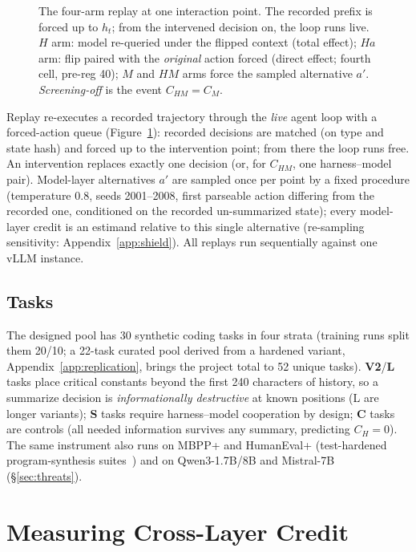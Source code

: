 \documentclass{article}
\theoremstyle{remark}
\begin{document}
\begin{figure}[t]
{}
\caption{The four-arm replay at one interaction point. The recorded
prefix is forced up to $h_t$; from the intervened decision on, the loop
runs live. $H$ arm: model re-queried under the flipped context (total
effect); $Ha$ arm: flip paired with the \emph{original} action forced
(direct effect; fourth cell, pre-reg 40); $M$ and $HM$ arms force the
sampled alternative $a'$. \emph{Screening-off} is the event $C_{HM} =
C_M$.}
\label{fig:method}
\end{figure}
Replay re-executes a recorded trajectory through the \emph{live} agent
loop with a forced-action queue (Figure~\ref{fig:method}): recorded
decisions are matched (on type and state hash) and forced up to the
intervention point; from there the loop runs free. An intervention
replaces exactly one decision (or, for $C_{HM}$, one harness--model pair).
Model-layer alternatives $a'$ are sampled once per point by a fixed
procedure (temperature $0.8$, seeds 2001--2008, first parseable action
differing from the recorded one, conditioned on the recorded
un-summarized state); every model-layer credit is an estimand relative to
this single alternative (re-sampling sensitivity: Appendix~\ref{app:shield}).
All replays run sequentially against one vLLM instance.

\subsection{Tasks}
The designed pool has 30 synthetic coding tasks in four strata (training
runs split them 20/10; a 22-task curated pool derived from a hardened
variant, Appendix~\ref{app:replication}, brings the project total to 52
unique tasks). \textbf{V2}/\textbf{L} tasks place critical constants
beyond the first 240 characters of history, so a summarize decision is
\emph{informationally destructive} at known positions (L are longer
variants); \textbf{S} tasks require harness--model cooperation by design;
\textbf{C} tasks are controls (all needed information survives any
summary, predicting $C_H = 0$). The same instrument also runs on MBPP+
and HumanEval+ (test-hardened program-synthesis
suites~\citep{evalplus2023}) and on Qwen3-1.7B/8B and Mistral-7B
(\S\ref{sec:threats}).

\section{Measuring Cross-Layer Credit}
\end{document}
